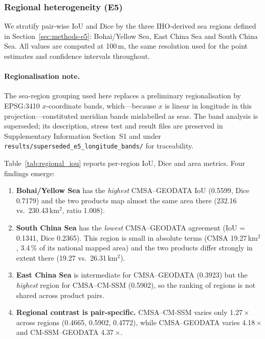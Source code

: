 \documentclass[11pt]{article}
\begin{document}
\subsubsection{Regional heterogeneity (E5)}
\label{sec:results-e5}

We stratify pair-wise IoU and Dice by the three IHO-derived sea regions defined
in Section~\ref{sec:methods-e5}: Bohai/Yellow Sea, East China Sea and South
China Sea. All values are computed at 100\,m, the same resolution used for the
point estimates and confidence intervals throughout.

\paragraph{Regionalisation note.}
The sea-region grouping used here replaces a preliminary regionalisation by
EPSG:3410 $x$-coordinate bands, which---because $x$ is linear in longitude in
this projection---constituted meridian bands mislabelled as seas. The band
analysis is superseded; its description, stress test and result files are
preserved in Supplementary Information Section~S1 and under
\texttt{results/superseded\_e5\_longitude\_bands/} for traceability.

Table~\ref{tab:regional_iou} reports per-region IoU, Dice and area metrics.
Four findings emerge:

\begin{enumerate}[nosep]
\item \textbf{Bohai/Yellow Sea} has the \emph{highest} CMSA--GEODATA IoU
  (0.5599, Dice 0.7179) and the two products map almost the same area there
  (232.16 vs.\ 230.43\,km$^2$, ratio 1.008).
\item \textbf{South China Sea} has the \emph{lowest} CMSA--GEODATA agreement
  (IoU = 0.1341, Dice 0.2365). This region is small in absolute terms
  (CMSA 19.27\,km$^2$, 3.4\,\% of its national mapped area) and the two
  products differ strongly in extent there (19.27 vs.\ 26.31\,km$^2$).
\item \textbf{East China Sea} is intermediate for CMSA--GEODATA (0.3923) but
  the \emph{highest} region for CMSA--CM-SSM (0.5902), so the ranking of
  regions is not shared across product pairs.
\item \textbf{Regional contrast is pair-specific.} CMSA--CM-SSM varies only
  1.27\,$\times$ across regions (0.4665, 0.5902, 0.4772), while
  CMSA--GEODATA varies 4.18\,$\times$ and CM-SSM--GEODATA 4.37\,$\times$.
\end{enumerate}
\end{document}
